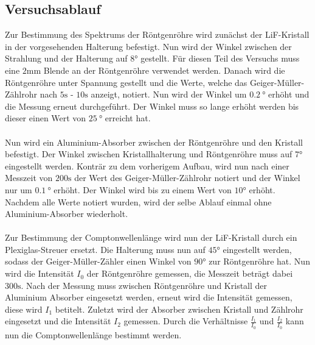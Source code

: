 \subsection{Versuchsablauf}
Zur Bestimmung des Spektrums der Röntgenröhre wird zunächst der LiF-Kristall in der vorgesehenden Halterung befestigt.
Nun wird der Winkel zwischen der Strahlung und der Halterung auf $8 \si{\degree}$ gestellt.
Für diesen Teil des Versuchs muss eine $2 \si{\milli\meter}$ Blende an der Röntgenröhre verwendet werden.
Danach wird die Röntgenröhre unter Spannung gestellt und die Werte, welche das Geiger-Müller-Zählrohr nach $5\si{\second}$ - $10\si{\second}$ anzeigt, notiert.
Nun wird der Winkel um $\SI{0.2}{\degree}$ erhöht und die Messung erneut durchgeführt.
Der Winkel muss so lange erhöht werden bis dieser einen Wert von $\SI{25}{\degree}$ erreicht hat.
\\\\
Nun wird ein Aluminium-Absorber zwischen der Röntgenröhre und den Kristall befestigt.
Der Winkel zwischen Kristallhalterung und Röntgenröhre muss auf $7\si{\degree}$ eingestellt werden.
Konträr zu dem vorherigem Aufbau, wird nun nach einer Messzeit von $200 \si{\second}$ der Wert des Geiger-Müller-Zählrohr notiert und der Winkel nur um $\SI{0.1}{\degree}$ erhöht.
Der Winkel wird bis zu einem Wert von $10\si{\degree}$ erhöht.
Nachdem alle Werte notiert wurden, wird der selbe Ablauf einmal ohne Aluminium-Absorber wiederholt.
\\\\
Zur Bestimmung der Comptonwellenlänge wird nun der LiF-Kristall durch ein Plexiglas-Streuer ersetzt.
Die Halterung muss nun auf $45 \si{\degree}$ eingestellt werden, sodass der Geiger-Müller-Zähler einen Winkel von $90\si{\degree}$ zur Röntgenröhre hat.
Nun wird die Intensität $I_0$ der Röntgenröhre gemessen, die Messzeit beträgt dabei $300\si{\second}$.
Nach der Messung muss zwischen Röntgenröhre und Kristall der Aluminium Absorber eingesetzt werden, erneut wird die Intensität gemessen, diese wird $I_1$ betitelt.
Zuletzt wird der Absorber zwischen Kristall und Zählrohr eingesetzt und die Intensität $I_2$ gemessen.
Durch die Verhältnisse $\frac{I_1}{I_0}$ und $\frac{I_2}{I_0}$ kann nun die Comptonwellenlänge bestimmt werden.
